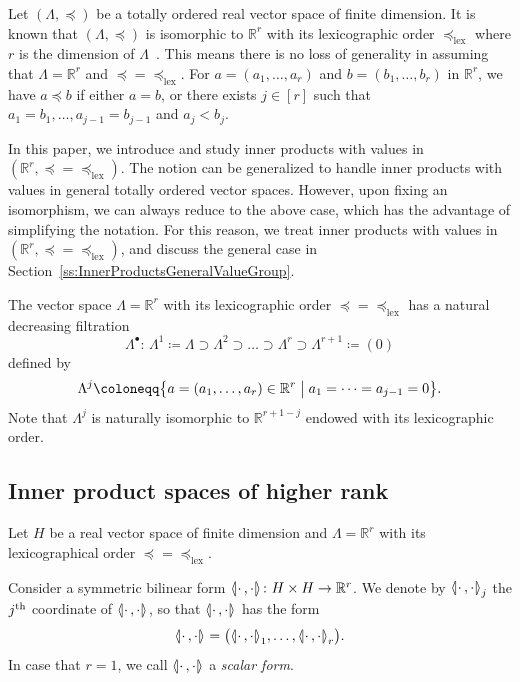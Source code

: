 \documentclass[AHL,Unicode,longabstracts]{cedram}
\newcommand{\llangle}{\mathopen{\langle\mkern -3.1mu\lvert}}
\newcommand{\rrangle}{\mathclose{\rvert\mkern -3.1mu\rangle}}
\newcommand{\highinn}[2]{{\llangle#2\rrangle_{#1}}}
\newcommand{\R}{\mathbb{R}}
\newcommand{\lexeq}{\preceq_{\mathrm{lex}}}
\renewcommand*{\to}{\mathchoice{\longrightarrow}{\rightarrow}{\rightarrow}{\rightarrow}}
\begin{document}
Let $(\Lambda, \preceq)$ be a totally ordered real vector space of finite dimension. It is known that $(\Lambda, \preceq)$ is isomorphic to $\R^r$ with its lexicographic order $\lexeq$ where $r$ is the dimension of $\Lambda$~\cite{Bir-Lattice, HW52}. This means there is no loss of generality in assuming that $\Lambda = \R^r$ and $\preceq =\lexeq$. For $a =(a_1, \dots, a_r)$ and $b=(b_1, \dots, b_r)$ in $\R^r$, we have $a \preceq b$ if either $a=b$, or there exists $j\in [r]$ such that $a_1=b_1, \dots, a_{j-1}=b_{j-1}$ and $a_j<b_j$.


In this paper, we introduce and study inner products with values in $(\R^r, \preceq=\lexeq)$. The notion can be generalized to handle inner products with values in general totally ordered vector spaces. However, upon fixing an isomorphism, we can always reduce to the above case, which has the advantage of simplifying the notation. For this reason, we treat inner products with values in $(\R^r, \preceq=\lexeq)$, and discuss the general case in Section~\ref{ss:InnerProductsGeneralValueGroup}.



The vector space $\Lambda = \R^r$ with its lexicographic order $\preceq=\lexeq$ has a natural decreasing filtration
\begin{equation}\label{eq:FiltrationRr}
\Lambda^\bullet \colon \, \Lambda^1 \coloneq \Lambda\supset \Lambda^2 \supset \dots \supset \Lambda^{r} \supset \Lambda^{r+1} \coloneq (0)
\end{equation}
defined by
\[
\Lambda^j \coloneqq \bigl\{a = (a_1, \dots, a_r) \in \R^r \bigm| a_1 = \dots =a_{j-1}=0\bigr\}.
\]
Note that $\Lambda^j$ is naturally isomorphic to $\R^{r+1-j}$ endowed with its lexicographic order.



\subsection{Inner product spaces of higher rank}

Let $H$ be a real vector space of finite dimension and $\Lambda =\R^r$ with its lexicographical order $\preceq=\lexeq$.

Consider a symmetric bilinear form $\highinn{}{\cdot \,, \cdot} \colon H \times H \to \R^r$. We denote by $\highinn{j}{\cdot\,, \cdot}$ the $j^{\rm th}$ coordinate of $\highinn{}{\cdot\,,\cdot}$, so that $\highinn{}{\cdot\,,\cdot}$ has the form
\[
\highinn{}{\cdot\,,\cdot} = \bigl(\highinn{1}{\cdot\,, \cdot}, \dots, \highinn{r}{\cdot\,, \cdot}\bigr).
\]
In case that $r=1$, we call $\highinn{}{\cdot \,, \cdot}$ a \emph{scalar form}.
\end{document}
